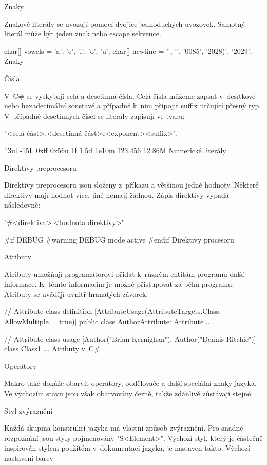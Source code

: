 \secc Znaky

Znakové literály se uvozují pomocí dvojice jednoduchých uvozovek.
Samotný literál může být jeden znak nebo escape sekvence.

\begtt
char[] vowels = {'a', 'e', 'i', 'o', 'u'};
char[] newline = {'\r', '\n', '\u0085', '\u2028)', '\u2029'};
\endtt
\priklad Znaky

\secc Čísla

V~C\# se vyskytují celá a desetinná čísla.
Celá čísla můžeme zapsat v~desítkové nebo hexadecimální soustavě a případně k~nim připojit suffix určující přesný typ.
V~případně desetinných čísel se literály zapisují ve tvaru:

"<celá část>.<desetinná část>e<exponent><suffix>".

         13ul         -15L       0xff         0x56u
    1f         1.5d        1e10m    123.456        12.86M
\endtt
\priklad Numerické literály

\sec Direktivy preprocesoru

Direktivy preprocesoru jsou složeny z~příkazu a většinou jedné hodnoty.
Některé direktivy mají hodnot více, jiné nemají žádnou.
Zápis direktivy vypadá následovně:

"#<direktiva> <hodnota direktivy>".

\begtt
#if DEBUG
#warning DEBUG mode active
#endif
\endtt
\priklad Direktivy procesoru

\sec Atributy

Atributy umožňují programátorovi přidat k~různým entitám programu další informace.
K~těmto informacím je možné přistupovat za běhu programu.
Atributy se uvádějí uvnitř hranatých závorek.

\begtt
// Attribute class definition
[AttributeUsage(AttributeTargets.Class, AllowMultiple = true)]
public class AuthorAttribute: Attribute
{ ... }

// Attribute class usage
[Author("Brian Kernighan"), Author("Dennis Ritchie")]
class Class1
{ ... }
\endtt
\priklad Atributy v~C\#

\sec Operátory

Makro také dokáže obarvit operátory, oddělovače a další speciální znaky jazyka.
Ve výchozím stavu jsou však obarvovány černě, takže zdánlivě zůstávají stejné.

\chap Styl zvýraznění

Každá skupina konstrukcí jazyka má vlastní způsob zvýraznění.
Pro snadné rozpoznání jsou styly pojmenovány "S<Element>".
Výchozí styl, který je částečně inspirován stylem použitém v~dokumentaci jazyka, je nastaven takto:
\midinsert
{}
\begtt
\let\SComment=\Green      %
\let\SDocComment=\Grey    %
\let\SPreprocKW=\Magenta  %
\let\SPreprocVal=\Magenta %
\let\SKeyword=\Blue       %
\let\SAttribute=\Cyan     %
\let\SLiteral=\Cyan       %
\let\SString=\Red         %
\let\SChar=\Red           %
\let\SNumber=\Black       %
\let\SOper=\Black         %
\endtt
\priklad Výchozí nastavení barev
\endinsert

